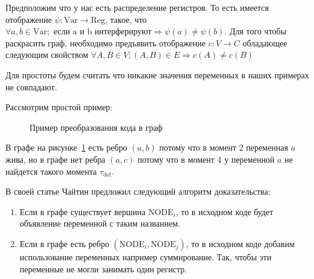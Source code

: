 \documentclass[12pt]{article}
\begin{document}
Предположим что у нас есть распределение регистров. То есть имеется отображение $\psi: \text{Var} \to \text{Reg}$,
такое, что $\forall a, b \in \text{Var}; \text{ если a и b интерферируют} \Rightarrow \psi(a) \neq \psi(b)$.
Для того чтобы раскрасить граф, необходимо предъявить отображение $c: V \to C$ обладающее следующим свойством
$\forall A, B \in V; (A, B) \in E \Rightarrow c(A) \neq c(B)$

Для простоты будем считать что никакие значения переменных в наших примерах не совпадают.

Рассмотрим простой пример:
\begin{figure}[H]
    \centering
\caption{Пример преобразования кода в граф}
\label{fig:ex1}
\end{figure}

В графе на рисунке~\ref{fig:ex1} есть ребро $(a, b)$ потому что в момент 2 переменная $a$ жива, но в графе нет ребра $(a, c)$
потому что в момент 4 у переменной $a$ не найдется такого момента $\tau_{\text{def}}$.



В своей статье Чайтин предложил следующий алгоритм доказательства:

\begin{enumerate}
    \item Если в графе существует вершина $\text{NODE}_i$, то в исходном коде будет объявление переменной с таким
    названием.
    \item Если в графе есть ребро $(\text{NODE}_i, \text{NODE}_j)$, то в исходном коде добавим использование переменных
    например суммирование. Так, чтобы эти переменные не могли занимать один регистр.
\end{enumerate}
\end{document}
